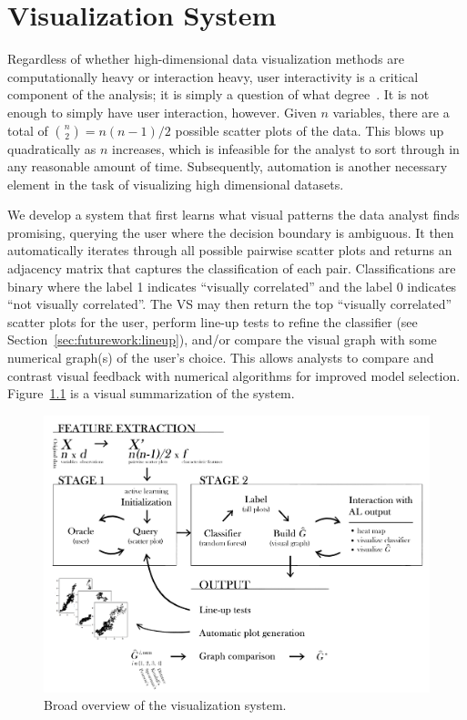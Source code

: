 \chapter{Visualization System \label{ch:visualizer}}

Regardless of whether high-dimensional data visualization methods are
computationally heavy or interaction heavy, user interactivity is a critical
component of the analysis; it is simply a question of what 
degree~\cite{lius2016}. It is not enough to simply have user interaction, 
however. Given $n$ variables, there are a total of ${n \choose 2} = n(n-1)/2$ 
possible scatter plots of the data. This blows up quadratically as $n$ 
increases, which is infeasible for the analyst to sort through in any 
reasonable amount of time. Subsequently, automation is another necessary 
element in the task of visualizing high dimensional datasets.

We develop a system that first learns what visual patterns the data analyst 
finds promising, querying the user where the decision boundary is ambiguous. It 
then automatically iterates through all possible pairwise scatter plots and 
returns an adjacency matrix that captures the classification of each pair. 
Classifications are binary where the label 1 indicates ``visually correlated'' 
and the label 0 indicates ``not visually correlated''. The VS may then return 
the top ``visually correlated'' scatter plots for the user, perform line-up 
tests to refine the classifier (see Section~\ref{sec:futurework:lineup}), 
and/or compare the visual graph with some numerical graph(s) of the user's 
choice. This allows analysts to compare and contrast visual feedback with 
numerical algorithms for improved model selection. 
Figure~\ref{fig:visualizer:vs} is a visual summarization of the system.
       
\begin{figure}[htb]
	\begin{center}
		\includegraphics[width=1\linewidth]{ch-visualizer/figures/vs}
		\caption[Broad overview of the visualization system.]{Broad overview of 
		the visualization system.}
		\label{fig:visualizer:vs}
	\end{center}
\end{figure}

